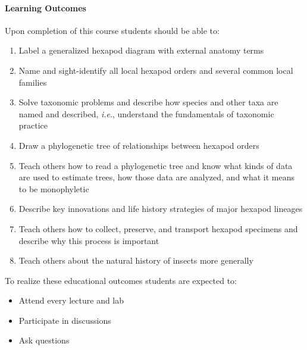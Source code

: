 \documentclass[11pt]{article}
\begin{document}
\paragraph{Learning Outcomes} Upon completion of this course students should be able to:
\begin{enumerate}
\item Label a generalized hexapod diagram with external anatomy terms
\item Name and sight-identify all local hexapod orders and several common local families
\item Solve taxonomic problems and describe how species and other taxa are named and described, \textit{i.e}., understand the fundamentals of taxonomic practice
\item Draw a phylogenetic tree of relationships between hexapod orders
\item Teach others how to read a phylogenetic tree and know what kinds of data are used to estimate trees, how those data are analyzed, and what it means to be monophyletic
\item Describe key innovations and life history strategies of major hexapod lineages
\item Teach others how to collect, preserve, and transport hexapod specimens and describe why this process is important
\item Teach others about the natural history of insects more generally
\end{enumerate} 

\noindent To realize these educational outcomes students are expected to:
\begin{itemize}
\item Attend every lecture and lab
\item Participate in discussions
\item Ask questions
\end{itemize}
\end{document}
